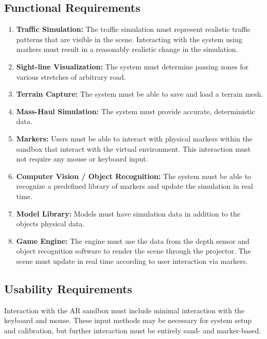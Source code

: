 \documentclass[letterpaper, 10pt, onecolumn, draftclsnofoot]{IEEEtran}
\begin{document}
    \subsection{\textbf{Functional Requirements}}
        \begin{enumerate}[\label={}]
           \item{\textbf{Traffic Simulation:} The traffic simulation must represent realistic traffic patterns that are visible in the scene. Interacting with the system using markers must result in a reasonably realistic change in the simulation.}
        
            \item{\textbf{Sight-line Visualization:} The system must determine passing zones for various stretches of arbitrary road.}
            
            \item{\textbf{Terrain Capture:} The system must be able to save and load a terrain mesh.}
            
            \item{\textbf{Mass-Haul Simulation:} The system must provide accurate, deterministic data.}
            
            \item{\textbf{Markers:} Users must be able to interact with physical markers within the sandbox that interact with the virtual environment. This interaction must not require any mouse or keyboard input.}
            
            \item{\textbf{Computer Vision / Object Recognition:} The system must be able to recognize a predefined library of markers and update the simulation in real time.}
            
            \item{\textbf{Model Library:}  Models must have simulation data in addition to the objects physical data.}
        
            \item{\textbf{Game Engine:} The engine must use the data from the depth sensor and object recognition software to render the scene through the projector. The scene must update in real time according to user interaction via markers.}
        \end{enumerate}
    
    \subsection{\textbf{Usability Requirements}}
    Interaction with the AR sandbox must include minimal interaction with the keyboard and mouse. These input methods may be necessary for system setup and calibration, but further interaction must be entirely sand- and marker-based.
    
\end{document}
